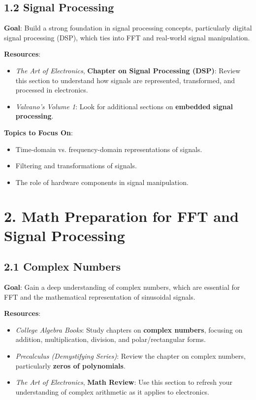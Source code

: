 \documentclass{article}
\begin{document}
\subsection*{1.2 Signal Processing}
\textbf{Goal}: Build a strong foundation in signal processing concepts, particularly digital signal processing (DSP), which ties into FFT and real-world signal manipulation.

\textbf{Resources}:
\begin{itemize}
    \item \textit{The Art of Electronics}, \textbf{Chapter on Signal Processing (DSP)}: Review this section to understand how signals are represented, transformed, and processed in electronics.
    \item \textit{Valvano’s Volume 1}: Look for additional sections on \textbf{embedded signal processing}.
\end{itemize}

\textbf{Topics to Focus On}:
\begin{itemize}
    \item Time-domain vs. frequency-domain representations of signals.
    \item Filtering and transformations of signals.
    \item The role of hardware components in signal manipulation.
\end{itemize}

\section*{2. Math Preparation for FFT and Signal Processing}

\subsection*{2.1 Complex Numbers}
\textbf{Goal}: Gain a deep understanding of complex numbers, which are essential for FFT and the mathematical representation of sinusoidal signals.

\textbf{Resources}:
\begin{itemize}
    \item \textit{College Algebra Books}: Study chapters on \textbf{complex numbers}, focusing on addition, multiplication, division, and polar/rectangular forms.
    \item \textit{Precalculus (Demystifying Series)}: Review the chapter on complex numbers, particularly \textbf{zeros of polynomials}.
    \item \textit{The Art of Electronics}, \textbf{Math Review}: Use this section to refresh your understanding of complex arithmetic as it applies to electronics.
\end{itemize}
\end{document}
